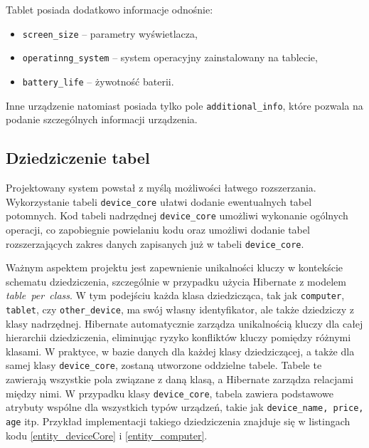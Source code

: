 Tablet posiada dodatkowo informacje odnośnie:
\begin{itemize}
	\item \texttt{screen\_size} -- parametry wyświetlacza,
	\item \texttt{operatinng\_system} -- system operacyjny zainstalowany na tablecie,
	\item \texttt{battery\_life} -- żywotność baterii.
\end{itemize}

Inne urządzenie natomiast posiada tylko pole \texttt{additional\_info}, które pozwala na podanie szczególnych informacji urządzenia.

\subsection{Dziedziczenie tabel}
\label{dzedziczenie_hibernate:label}
Projektowany system powstał z myślą możliwości łatwego rozszerzania. Wykorzystanie tabeli \texttt{device\_core} ułatwi dodanie ewentualnych tabel potomnych. Kod tabeli nadrzędnej \texttt{device\_core} umożliwi wykonanie ogólnych operacji, co zapobiegnie powielaniu kodu oraz umożliwi dodanie tabel rozszerzających zakres danych zapisanych już w tabeli \texttt{device\_core}. 

Ważnym aspektem projektu jest zapewnienie unikalności kluczy w kontekście schematu dziedziczenia, szczególnie w przypadku użycia Hibernate z modelem \emph{table~per~class}. W tym podejściu każda klasa dziedzicząca, tak jak \texttt{computer}, \texttt{tablet}, czy \texttt{other\_device}, ma swój własny identyfikator, ale także dziedziczy z klasy nadrzędnej. Hibernate automatycznie zarządza unikalnością kluczy dla całej hierarchii dziedziczenia, eliminując ryzyko konfliktów kluczy pomiędzy różnymi klasami. W praktyce, w bazie danych dla każdej klasy dziedziczącej, a także dla samej klasy \texttt{device\_core}, zostaną utworzone oddzielne tabele. Tabele te zawierają wszystkie pola związane z daną klasą, a Hibernate zarządza relacjami między nimi. W przypadku klasy \texttt{device\_core}, tabela zawiera podstawowe atrybuty wspólne dla wszystkich typów urządzeń, takie jak \texttt{device\_name, price, age} itp. Przykład implementacji takiego dziedziczenia znajduje się w listingach kodu \ref{entity_deviceCore} i \ref{entity_computer}.

